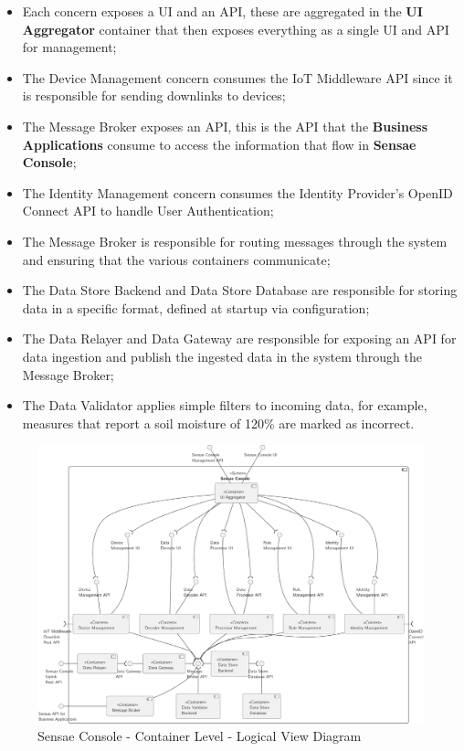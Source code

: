 \begin{itemize}
   \item Each concern exposes a \gls{UI} and an \gls{API}, these are aggregated in the \textbf{UI Aggregator} container that then exposes everything as a single \gls{UI} and \gls{API} for management;
   \item The Device Management concern consumes the \gls{IoT} Middleware API since it is responsible for sending downlinks to devices;
   \item The Message Broker exposes an \gls{API}, this is the \gls{API} that the \textbf{Business Applications} consume to access the information that flow in \textbf{Sensae Console};
   \item The Identity Management concern consumes the Identity Provider's OpenID Connect API to handle User Authentication;
   \item The Message Broker is responsible for routing messages through the system and ensuring that the various containers communicate;
   \item The Data Store Backend and Data Store Database are responsible for storing data in a specific format, defined at startup via configuration;
   \item The Data Relayer and Data Gateway are responsible for exposing an \gls{API} for data ingestion and publish the ingested data in the system through the Message Broker;
   \item The Data Validator applies simple filters to incoming data, for example, measures that report a soil moisture of 120\% are marked as incorrect.
\end{itemize}

\begin{figure}
   \centering
   \includegraphics[page=1,width=0.8\columnwidth]{assets/diagrams/design/architectural/level2/logical/contexts-v2.pdf}
   \caption[Sensae Console - Container Level - Logical View Diagram]{Sensae Console - Container Level - Logical View Diagram}
      \label{fig:design:architecture:platform:containers:logical:complete}
\end{figure}

